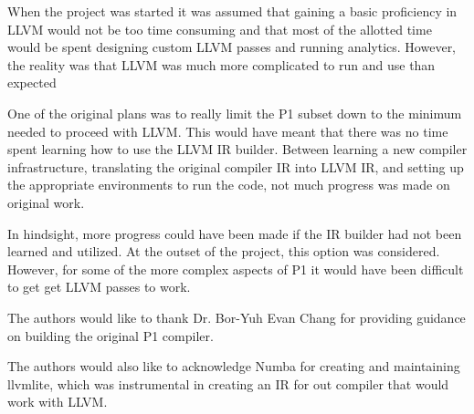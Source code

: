 When the project was started it was assumed that gaining a basic proficiency in LLVM would not be too time consuming and that most of the allotted time would be spent designing custom LLVM passes and running analytics. However, the reality was that LLVM was much more complicated to run and use than expected

One of the original plans was to really limit the P1 subset down to the minimum needed to proceed with LLVM. This would have meant that there was no time spent learning how to use the LLVM IR builder. Between learning a new compiler infrastructure, translating the original compiler IR into LLVM IR, and setting up the appropriate environments to run the code, not much progress was made on original work.

In hindsight, more progress could have been made if the IR builder had not been learned and utilized. At the outset of the project, this option was considered. However, for some of the more complex aspects of P1 it would have been difficult to get get LLVM passes to work.

\begin{acks}

The authors would like to thank Dr. Bor-Yuh Evan Chang for providing guidance on building the original P1 compiler.

The authors would also like to acknowledge Numba for creating and maintaining llvmlite, which was instrumental in creating an IR for out compiler that would work with LLVM.
\end{acks}
